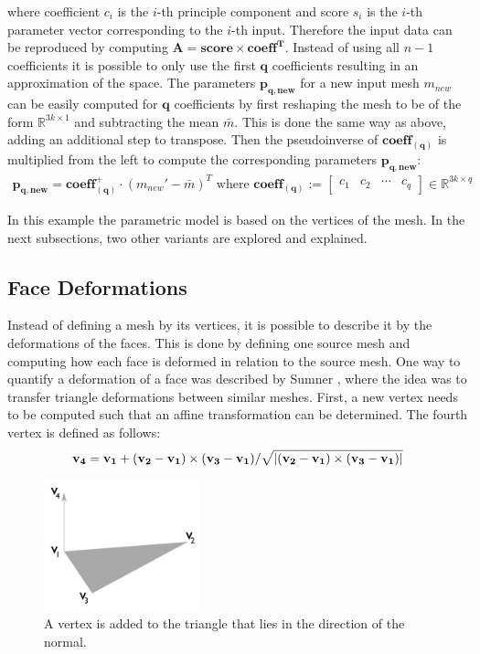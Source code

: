 where coefficient $c_i$ is the $i$-th principle component and score $s_i$ is the $i$-th parameter vector corresponding to the $i$-th input. Therefore the input data can be reproduced by computing $\mathbf{A = score \times {coeff}^T}$. Instead of using all $n-1$ coefficients it is possible to only use the first $\mathbf{q}$ coefficients resulting in an approximation of the space. The parameters $\mathbf{p_{q,new}}$ for a new input mesh $m_{new}$ can be easily computed for $\mathbf{q}$ coefficients by first reshaping the mesh to be of the form $\mathbb{R}^{3k \times 1}$ and subtracting the mean $\bar{m}$. This is done the same way as above, adding an additional step to transpose. Then the pseudoinverse of $\mathbf{coeff_{(q)}}$ is multiplied from the left to compute the corresponding parameters $\mathbf{p_{q,new}}$:
\begin{gather}
\mathbf{p_{q,new}} = \mathbf{coeff^+_{(q)}} \cdot (m_{new}' - \bar{m})^T  \text{  where }
\mathbf{coeff_{(q)}} :=
\begin{bmatrix}
 c_1&c_2&\cdots&c_{q}
\end{bmatrix}
\in \mathbb{R}^{3k \times q}
\end{gather}

In this example the parametric model is based on the vertices of the mesh. In the next subsections, two other variants are explored and explained.
\subsection{Face Deformations}
\label{faceDeform}
Instead of defining a mesh by its vertices, it is possible to describe it by the deformations of the faces. This is done by defining one source mesh and computing how each face is deformed in relation to the source mesh. One way to quantify a deformation of a face was described by Sumner \cite{sumner2004deformation}, where the idea was to transfer triangle deformations between similar meshes. First, a new vertex needs to be computed such that an affine transformation can be determined. The fourth vertex is defined as follows:
\begin{gather}
  \mathbf{v_4} = \mathbf{v_1} + (\mathbf{v_2} - \mathbf{v_1})\times(\mathbf{v_3}-\mathbf{v_1})/\sqrt{\lvert(\mathbf{v_2}-\mathbf{v_1})\times(\mathbf{v_3}-\mathbf{v_1})\rvert} \label{normalequation}
\end{gather}
\begin{figure}[h]
\centering
\includegraphics[width=0.4\textwidth]{figures/normal}
\caption{A vertex is added to the triangle that lies in the direction of the normal.}
\label{fig:normal}
\end{figure}

